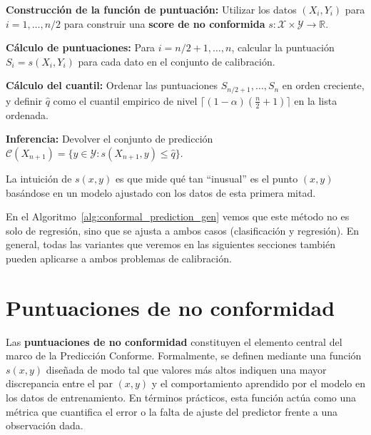 \begin{algorithm}[H]
\caption{SCP caso general}
\label{alg:conformal_prediction_gen}
    \begin{algorithmic}[1]
    \STATE \textbf{Construcción de la función de puntuación:} Utilizar los datos $(X_i, Y_i)$ para $i = 1, \dots, n/2$ para construir una \textbf{score de no conformida} $s : \mathcal{X} \times \mathcal{Y} \to \mathbb{R}$.

    \STATE \textbf{Cálculo de puntuaciones:} Para $i = n/2 + 1, \dots, n$, calcular la puntuación $S_i = s(X_i, Y_i)$ para cada dato en el conjunto de calibración.

    \STATE \textbf{Cálculo del cuantil:} Ordenar las puntuaciones $S_{n/2+1}, \dots, S_n$ en orden creciente, y definir $\hat{q}$ como el cuantil empirico de nivel $\lceil(1 - \alpha)(\frac{n}{2} + 1)\rceil$ en la lista ordenada.

    \STATE \textbf{Inferencia:} Devolver el conjunto de predicción $\mathcal{C}(X_{n+1}) = \{y \in \mathcal{Y} : s(X_{n+1}, y) \leq \hat{q}\}$.
    \end{algorithmic}
\end{algorithm}

La intuición de $s(x, y)$ es que mide qué tan ``inusual'' es el punto $(x, y)$ basándose en un modelo ajustado con los datos de esta primera mitad.

En el Algoritmo~\ref{alg:conformal_prediction_gen} vemos que este método no es solo de regresión, sino que se ajusta a ambos casos (clasificación y regresión). En general, todas las variantes que veremos en las siguientes secciones también pueden aplicarse a ambos problemas de calibración.

\section{Puntuaciones de no conformidad}

Las \textbf{puntuaciones de no conformidad} constituyen el elemento central del marco de la Predicción Conforme. Formalmente, se definen mediante una función $s(x, y)$ diseñada de modo tal que valores más altos indiquen una mayor discrepancia entre el par $(x, y)$ y el comportamiento aprendido por el modelo en los datos de entrenamiento. En términos prácticos, esta función actúa como una métrica que cuantifica el error o la falta de ajuste del predictor frente a una observación dada.

